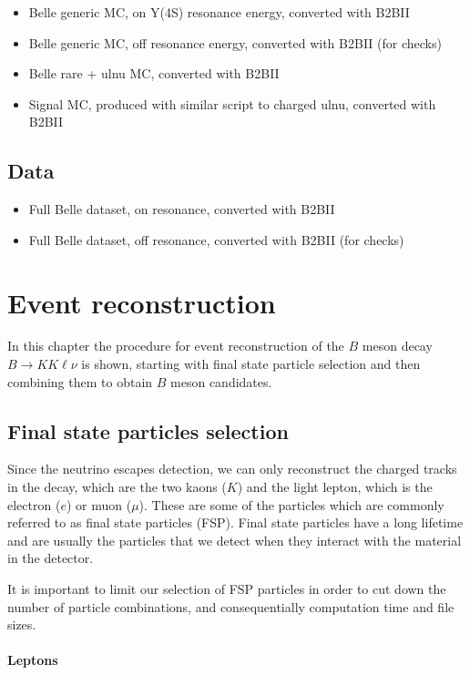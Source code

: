 \documentclass[oneside,a4paper,openany,12pt]{scrbook}
\begin{document}
\begin{itemize}
\item Belle generic MC, on Y(4S) resonance energy, converted with B2BII
\item Belle generic MC, off resonance energy, converted with B2BII (for checks)
\item Belle rare + ulnu MC, converted with B2BII
\item Signal MC, produced with similar script to charged ulnu, converted with B2BII
\end{itemize}

\section{Data}

\begin{itemize}
\item Full Belle dataset, on resonance, converted with B2BII
\item Full Belle dataset, off resonance, converted with B2BII (for checks)
\end{itemize}


\chapter{Event reconstruction}

In this chapter the procedure for event reconstruction of the $B$ meson decay $B \to K K \ell \nu$ is shown, starting with final state particle selection and then combining them to obtain $B$ meson candidates. 

\section{Final state particles selection}

Since the neutrino escapes detection, we can only reconstruct the charged tracks in the decay, which are the two kaons ($K$) and the light lepton, which is the electron ($e$) or muon ($\mu$). These are some of the particles which are commonly referred to as final state particles (FSP). Final state particles have a long lifetime and are usually the particles that we detect when they interact with the material in the detector.

It is important to limit our selection of FSP particles in order to cut down the number of particle combinations,  and consequentially computation time and file sizes.

\subsubsection{Leptons}
\end{document}
